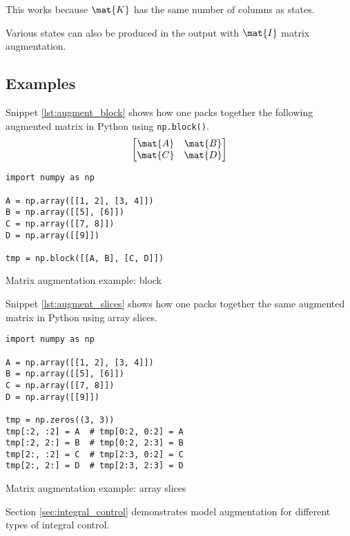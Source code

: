 This works because $\mat{K}$ has the same number of columns as \glspl{state}.

Various \glspl{state} can also be produced in the \gls{output} with $\mat{I}$
matrix augmentation.

\subsection{Examples}

Snippet \ref{lst:augment_block} shows how one packs together the following
augmented matrix in Python using \texttt{np.block()}.
\begin{equation*}
  \begin{bmatrix}
    \mat{A} & \mat{B} \\
    \mat{C} & \mat{D}
  \end{bmatrix}
\end{equation*}
\begin{code}
  \begin{lstlisting}[style=customPython]
import numpy as np

A = np.array([[1, 2], [3, 4]])
B = np.array([[5], [6]])
C = np.array([[7, 8]])
D = np.array([[9]])

tmp = np.block([[A, B], [C, D]])
  \end{lstlisting}
  \caption{Matrix augmentation example: block}
  \label{lst:augment_block}
\end{code}

Snippet \ref{lst:augment_slices} shows how one packs together the same augmented
matrix in Python using array slices.
\begin{code}
  \begin{lstlisting}[style=customPython]
import numpy as np

A = np.array([[1, 2], [3, 4]])
B = np.array([[5], [6]])
C = np.array([[7, 8]])
D = np.array([[9]])

tmp = np.zeros((3, 3))
tmp[:2, :2] = A  # tmp[0:2, 0:2] = A
tmp[:2, 2:] = B  # tmp[0:2, 2:3] = B
tmp[2:, :2] = C  # tmp[2:3, 0:2] = C
tmp[2:, 2:] = D  # tmp[2:3, 2:3] = D
  \end{lstlisting}
  \caption{Matrix augmentation example: array slices}
  \label{lst:augment_slices}
\end{code}

Section \ref{sec:integral_control} demonstrates \gls{model} augmentation for
different types of integral control.
